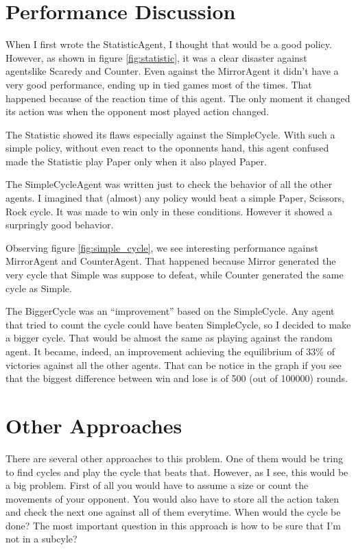 \documentclass[12pt]{article}
\begin{document}
\section{Performance Discussion}

When I first wrote the StatisticAgent, I thought that would be a good policy.
However, as shown in figure \ref{fig:statistic}, it was a clear disaster against agentslike Scaredy and Counter. Even against the MirrorAgent it didn't have a very good performance, ending up in tied games most of the times. That happened because of the reaction time of this agent. The only moment it changed its action was when the opponent most played action changed.

The Statistic showed its flaws especially against the SimpleCycle. With such a simple policy, without even react to the oponnents hand, this agent confused made the Statistic play Paper only when it also played Paper.

The SimpleCycleAgent was written just to check the behavior of all the other agents. I imagined that (almost) any policy would beat a simple Paper, Scissors, Rock cycle. It was made to win only in these conditions. However it showed a surpringly good behavior.

Observing figure \ref{fig:simple_cycle}, we see interesting performance against MirrorAgent and CounterAgent. That happened because Mirror generated the very cycle that Simple was suppose to defeat, while Counter generated the same cycle as Simple.

The BiggerCycle was an ``improvement'' based on the SimpleCycle. Any agent that tried to count the cycle could have beaten SimpleCycle, so I decided to make a bigger cycle. That would be almost the same as playing against the random agent. It became, indeed, an improvement achieving the equilibrium of 33\% of victories against all the other agents. That can be notice in the graph if you see that the biggest difference between win and lose is of 500 (out of 100000) rounds.

\section{Other Approaches}

There are several other approaches to this problem. One of them would be tring to find cycles and play the cycle that beats that. However, as I see, this would be a big problem. First of all you would have to assume a size or count the movements of your opponent. You would also have to store all the action taken and check the next one against all of them everytime. When would the cycle be done? The most important question in this approach is how to be sure that I'm not in a subcyle?
\end{document}
